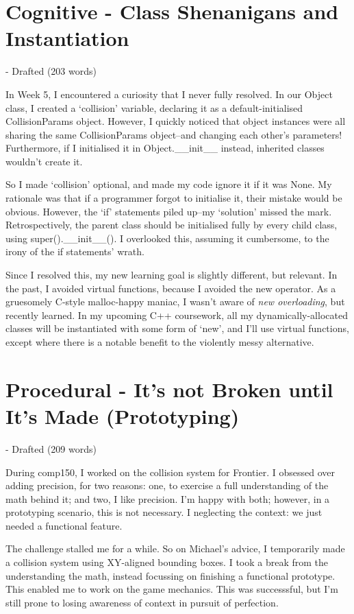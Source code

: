 \documentclass{scrartcl}
\begin{document}
\section{Cognitive - Class Shenanigans and Instantiation} - Drafted (203 words)

In Week 5, I encountered a curiosity that I never fully resolved. In our Object class, I created a `collision' variable, declaring it as a default-initialised CollisionParams object. However, I quickly noticed that object instances were all sharing the same CollisionParams object--and changing each other's parameters! Furthermore, if I initialised it in Object.__init__ instead, inherited classes wouldn't create it.

So I made `collision' optional, and made my code ignore it if it was None. My rationale was that if a programmer forgot to initialise it, their mistake would be obvious. However, the `if' statements piled up--my `solution' missed the mark. Retrospectively, the parent class should be initialised fully by every child class, using super().__init__(). I overlooked this, assuming it cumbersome, to the irony of the if statements' wrath.

Since I resolved this, my new learning goal is slightly different, but relevant. In the past, I avoided virtual functions, because I avoided the new operator. As a gruesomely C-style malloc-happy maniac, I wasn't aware of \textit{new overloading}, but recently learned. In my upcoming C++ coursework, all my dynamically-allocated classes will be instantiated with some form of `new', and I'll use virtual functions, except where there is a notable benefit to the violently messy alternative.

\section{Procedural - It's not Broken until It's Made (Prototyping)} - Drafted (209 words)

During comp150, I worked on the collision system for Frontier. I obsessed over adding precision, for two reasons: one, to exercise a full understanding of the math behind it; and two, I like precision. I'm happy with both; however, in a prototyping scenario, this is not necessary. I neglecting the context: we just needed a functional feature.

The challenge stalled me for a while. So on Michael's advice, I temporarily made a collision system using XY-aligned bounding boxes. I took a break from the understanding the math, instead focussing on finishing a functional prototype. This enabled me to work on the game mechanics. This was successsful, but I'm still prone to losing awareness of context in pursuit of perfection.
\end{document}

